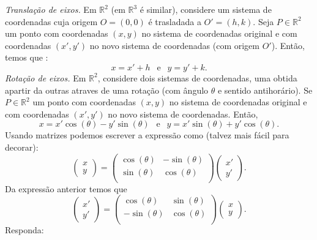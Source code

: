\documentclass{article}
\begin{document}
 {\it Translação de eixos.} Em $\mathbb{R}^{2}$ (em $\mathbb{R}^{3}$ é similar), considere um sistema de coordenadas cuja origem $O=(0,0)$ é trasladada a $O'=(h,k)$.
 Seja $P \in \mathbb{R}^{2}$ um ponto com coordenadas 
 $(x,y)$ no sistema de coordenadas original e 
 com coordenadas $(x',y')$ no 
 novo sistema de coordenadas (com origem $O'$). Então, temos que :
   $$  x=x'+h \ \ \text{ e } \ \ y=y'+k.$$
 {\it Rotação de eixos.} Em $\mathbb{R}^{2}$, considere dois sistemas de coordenadas, uma obtida apartir da outras atraves de uma rotação (com ângulo 
 $\theta$ e sentido antihorário). Se
 $P \in \mathbb{R}^{2}$ um ponto com coordenadas 
 $(x,y)$ no sistema de coordenadas original e 
 com coordenadas $(x',y')$ no 
 novo sistema de coordenadas. Então, 
 $$  x=x'\cos(\theta)-y'\sin(\theta) \ \ \text{ e } \ \ 
     y=x'\sin(\theta)+y'\cos(\theta).$$
 Usando matrizes podemos escrever a expressão como (talvez mais fácil para decorar):
 $$  
     \begin{pmatrix}
      x \\
      y
     \end{pmatrix}= \begin{pmatrix}
                    \cos(\theta) & -\sin(\theta) \\
                    \sin(\theta) &  \cos(\theta) \\
                    \end{pmatrix}  
                     \begin{pmatrix}
                     x' \\
                     y'
                     \end{pmatrix}.
 $$                       
 Da expressão anterior temos que
  $$  
     \begin{pmatrix}
      x'\\
      y'
     \end{pmatrix}= \begin{pmatrix}
                    \cos(\theta)  &  \sin(\theta) \\
                    -\sin(\theta) &  \cos(\theta) \\
                    \end{pmatrix}  
                     \begin{pmatrix}
                     x \\
                     y
                     \end{pmatrix}.
 $$  
 Responda:
\end{document}
